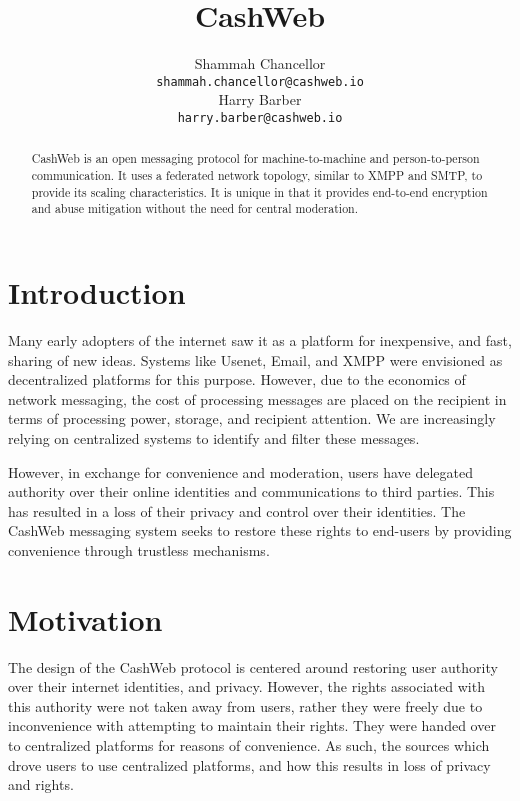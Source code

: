 \documentclass{article}
\title{CashWeb}
\author{
  Shammah Chancellor \\
  \texttt{shammah.chancellor@cashweb.io} \\
  \And
  Harry Barber \\
  \texttt{harry.barber@cashweb.io} \\
}
\theoremstyle{definition}
\begin{document}
\maketitle

\begin{abstract}
CashWeb is an open messaging protocol for machine-to-machine and person-to-person communication. It uses a federated network topology, similar to XMPP and SMTP, to provide its scaling characteristics. It is unique in that it provides end-to-end encryption and abuse mitigation without the need for central moderation.
\end{abstract}

\section{Introduction}
Many early adopters of the internet saw it as a platform for inexpensive, and fast, sharing of new ideas. Systems like Usenet\cite{rfc5536}\cite{rfc5537}, Email\cite{rfc5322}\cite{rfc1939}\cite{rfc5321}\cite{rfc4551}, and XMPP\cite{rfc3920}\cite{rfc3921}\cite{rfc3922}\cite{rfc3923} were envisioned as decentralized platforms for this purpose. However, due to the economics of network messaging, the cost of processing messages are placed on the recipient in terms of processing power, storage, and recipient attention. We are increasingly relying on centralized systems to identify and filter these messages.

However, in exchange for convenience and moderation, users have delegated authority over their online identities and communications to third parties. This has resulted in a loss of their privacy and control over their identities. The CashWeb messaging system seeks to restore these rights to end-users by providing convenience through trustless mechanisms. 

\section{Motivation}

The design of the CashWeb protocol is centered around restoring user authority over their internet identities, and privacy. However, the rights associated with this authority were not taken away from users, rather they were freely due to inconvenience with attempting to maintain their rights. They were handed over to centralized platforms for reasons of convenience. As such, the sources which drove users to use centralized platforms, and how this results in loss of privacy and rights.
\end{document}

